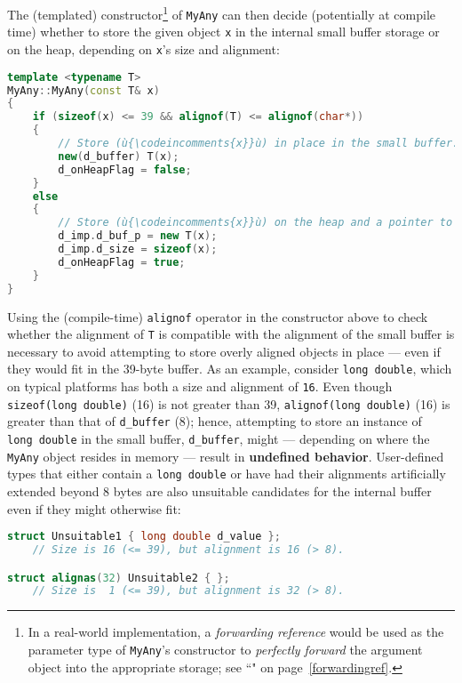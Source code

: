 \noindent The (templated) constructor{\cprotect\footnote{In a real-world
implementation, a \emph{forwarding reference} would be used as the
parameter type of \texttt{MyAny}'s constructor to
\emph{perfectly forward} the argument object into the appropriate
  storage; see ``" on page~\ref{forwardingref}.}} of \texttt{MyAny}
can then decide (potentially at compile time) whether to store the given
object \texttt{x} in the internal small buffer storage or on the heap,
depending on \texttt{x}'s size and alignment:

\begin{lstlisting}[language=C++]
template <typename T>
MyAny::MyAny(const T& x)
{
    if (sizeof(x) <= 39 && alignof(T) <= alignof(char*))
    {
        // Store (ù{\codeincomments{x}}ù) in place in the small buffer.
        new(d_buffer) T(x);
        d_onHeapFlag = false;
    }
    else
    {
        // Store (ù{\codeincomments{x}}ù) on the heap and a pointer to it in the small buffer.
        d_imp.d_buf_p = new T(x);
        d_imp.d_size = sizeof(x);
        d_onHeapFlag = true;
    }
}
\end{lstlisting}
    
\noindent Using the (compile-time) \texttt{alignof} operator in the constructor
above to check whether the alignment of \texttt{T} is compatible with
the alignment of the small buffer is necessary to avoid attempting to
store overly aligned objects in place --- even if they would fit in the
39-byte buffer. As an example, consider \texttt{long}~\texttt{double},
which on typical platforms has both a size and alignment of
\texttt{16}. Even though \texttt{sizeof(long}~\texttt{double)} (16) is not greater
than 39, \texttt{alignof(long}~\texttt{double)} (16) is greater than
that of \texttt{d\_buffer} (8); hence, attempting to store an instance
of \texttt{long}~\texttt{double} in the small buffer, \texttt{d\_buffer}, might
--- depending on where the \texttt{MyAny} object resides in memory --- result
in \textbf{undefined behavior}. User-defined types that either contain
a \texttt{long}~\texttt{double} or have had their alignments
artificially extended beyond 8 bytes are also unsuitable candidates for the
internal buffer even if they might otherwise fit:

\begin{lstlisting}[language=C++]
struct Unsuitable1 { long double d_value };
    // Size is 16 (<= 39), but alignment is 16 (> 8).

struct alignas(32) Unsuitable2 { };
    // Size is  1 (<= 39), but alignment is 32 (> 8).
\end{lstlisting}


